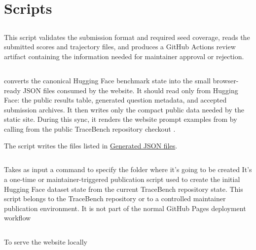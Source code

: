 \documentclass[11pt]{article}
\begin{document}
\section{Scripts}
\subsection*{}
This script validates the submission format and required seed coverage, reads the submitted scores and trajectory files, and produces a GitHub Actions review artifact containing the information needed for maintainer approval or rejection.

\subsection*{}

 converts the canonical Hugging Face benchmark state into the small browser-ready JSON files consumed by the website.
It should read only from Hugging Face: the public results table, generated question metadata, and accepted submission archives.
It then writes only the compact public data needed by the static site.
During this sync, it renders the website prompt examples from  by calling  from the public TraceBench repository checkout .

The script writes the files listed in \hyperref[sec:website-generated-json-file-list]{Generated JSON files}.

\subsection*{}
Takes as input a command  to specify the folder where it's going to be created
It's a one-time or maintainer-triggered publication script used to create the initial Hugging Face dataset state from the current TraceBench repository state.
This script belongs to the TraceBench repository or to a controlled maintainer publication environment.
It is not part of the normal GitHub Pages deployment workflow
\subsection*{}
To serve the website locally
\end{document}

